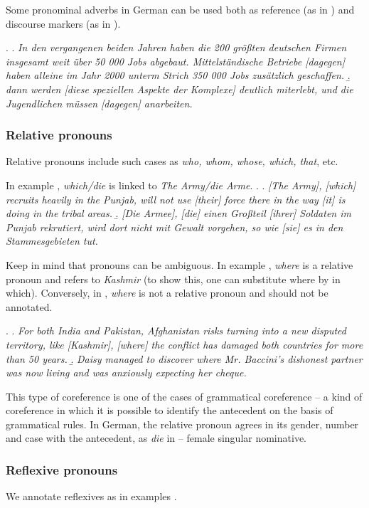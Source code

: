 \documentclass[a4paper]{article}
\begin{document}
Some pronominal adverbs in German can be used both as reference (as in \Next[b]) and discourse markers (as in \Next[a]).

\ex.
\a. {\sl In den vergangenen beiden Jahren haben die 200 größten deutschen Firmen insgesamt weit über 50 000 Jobs abgebaut. Mittelständische Betriebe [dagegen] haben alleine im Jahr 2000 unterm Strich 350 000 Jobs zusätzlich geschaffen.}
\b. {\sl dann werden [diese speziellen Aspekte der Komplexe] deutlich miterlebt, und die Jugendlichen müssen [dagegen] anarbeiten.}

\subsubsection{Relative pronouns}

Relative pronouns include such cases as {\sl who, whom, whose, which, that}, etc.

In example \Next, {\sl which/die} is linked to {\sl The Army/die Arme}.
\ex.
\a. {\sl [The Army], [which] recruits heavily in the Punjab, will not use [their] force there in the way [it] is doing in the tribal areas.}
\b. {\sl [Die Armee], [die] einen Großteil [ihrer] Soldaten im Punjab rekrutiert,
wird dort nicht mit Gewalt vorgehen, so wie [sie] es in den Stammesgebieten
tut.}

Keep in mind that pronouns can be ambiguous. In example \Next[a], {\sl where} is a relative pronoun and refers to {\sl Kashmir} (to show this, one
can substitute where by in which). Conversely, in \Next[b], {\sl where} is not a relative pronoun and should not be annotated.

\ex.
\a. {\sl For both India and Pakistan, Afghanistan risks turning into a new disputed
territory, like [Kashmir], [where] the conflict has damaged both countries for more than 50 years.}
\b. {\sl Daisy managed to discover where Mr. Baccini’s dishonest partner was now living and was anxiously expecting her cheque.}

This type of coreference is one of the cases of grammatical coreference --  a kind of coreference in which it is possible to identify the antecedent on the basis of grammatical rules. In German, the relative pronoun agrees in its gender, number and case with the antecedent, as {\sl die} in \LLast[b] -- female singular nominative.

\subsubsection{Reflexive pronouns}
We annotate reflexives as in examples \Next.
\end{document}
